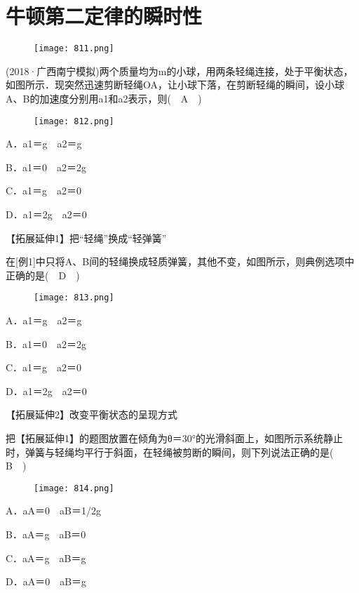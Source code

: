 \documentclass[cn,11pt]{elegantbook}
\begin{document}
\section{牛顿第二定律的瞬时性}
\begin{figure}[htbp]
   \centering
   \texttt{[image: 811.png]}
\end{figure}

\begin{example}
   (2018·广西南宁模拟)两个质量均为m的小球，用两条轻绳连接，处于平衡状态，如图所示．现突然迅速剪断轻绳OA，让小球下落，在剪断轻绳的瞬间，设小球A、B的加速度分别用a1和a2表示，则(　A　)   
   \begin{figure}[htbp]
      \centering
      \texttt{[image: 812.png]}
   \end{figure}
   A．a1＝g　a2＝g	
   
   B．a1＝0　a2＝2g
   
   C．a1＝g　a2＝0	
   
   D．a1＝2g　a2＝0

   【拓展延伸1】把“轻绳”换成“轻弹簧”

   在[例1]中只将A、B间的轻绳换成轻质弹簧，其他不变，如图所示，则典例选项中正确的是(　D　)
   \begin{figure}[htbp]
      \centering
      \texttt{[image: 813.png]}
   \end{figure}
   A．a1＝g　a2＝g	

   B．a1＝0　a2＝2g

   C．a1＝g　a2＝0	

   D．a1＝2g　a2＝0

   【拓展延伸2】改变平衡状态的呈现方式

   把【拓展延伸1】的题图放置在倾角为θ＝30°的光滑斜面上，如图所示系统静止时，弹簧与轻绳均平行于斜面，在轻绳被剪断的瞬间，则下列说法正确的是(　B　)
   \begin{figure}[htbp]
      \centering
      \texttt{[image: 814.png]}
   \end{figure}
   A．aA＝0　aB＝1/2g

   B．aA＝g　aB＝0
   
   C．aA＝g　aB＝g	
   
   D．aA＝0　aB＝g

\end{example}
\end{document}
